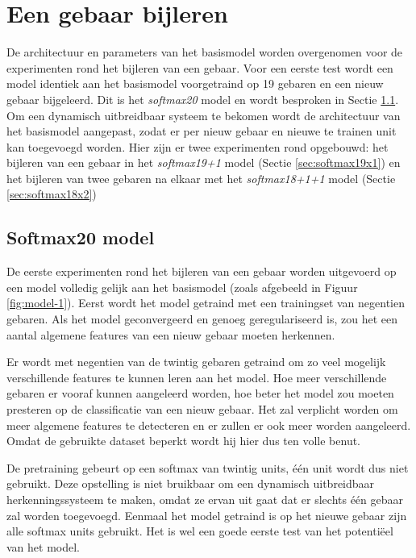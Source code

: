 \section{Een gebaar bijleren}\label{sec:experimenten}

De architectuur en parameters van het basismodel worden overgenomen voor de experimenten rond het bijleren van een gebaar. Voor een eerste test wordt een model identiek aan het basismodel voorgetraind op 19 gebaren en een nieuw gebaar bijgeleerd. Dit is het \textit{softmax20} model en wordt besproken in Sectie \ref{sec:softmax20}.
\npar Om een dynamisch uitbreidbaar systeem te bekomen wordt de architectuur van het basismodel aangepast, zodat er per nieuw gebaar en nieuwe te trainen unit kan toegevoegd worden. Hier zijn er twee experimenten rond opgebouwd: het bijleren van een gebaar in het \textit{softmax19+1} model (Sectie \ref{sec:softmax19x1}) en het bijleren van twee gebaren na elkaar met het \textit{softmax18+1+1} model (Sectie \ref{sec:softmax18x2})

\subsection{Softmax20 model}\label{sec:softmax20}

De eerste experimenten rond het bijleren van een gebaar worden uitgevoerd op een model volledig gelijk aan het basismodel (zoals afgebeeld in Figuur \ref{fig:model-1}). Eerst wordt het model getraind met een trainingset van negentien gebaren. Als het model geconvergeerd en genoeg geregulariseerd is, zou het een aantal algemene features van een nieuw gebaar moeten herkennen.

\npar Er wordt met negentien van de twintig gebaren getraind om zo veel mogelijk verschillende features te kunnen leren aan het model. Hoe meer verschillende gebaren er vooraf kunnen aangeleerd worden, hoe beter het model zou moeten presteren op de classificatie van een nieuw gebaar. Het zal verplicht worden om meer algemene features te detecteren en er zullen er ook meer worden aangeleerd. Omdat de gebruikte dataset beperkt wordt hij hier dus ten volle benut.

\npar De pretraining gebeurt op een softmax van twintig units, \'e\'en unit wordt dus niet gebruikt. Deze opstelling is niet bruikbaar om een dynamisch uitbreidbaar herkenningssysteem te maken, omdat ze ervan uit gaat dat er slechts \'e\'en gebaar zal worden toegevoegd. Eenmaal het model getraind is op het nieuwe gebaar zijn alle softmax units gebruikt. Het is wel een goede eerste test van het potenti\"eel van het model.

